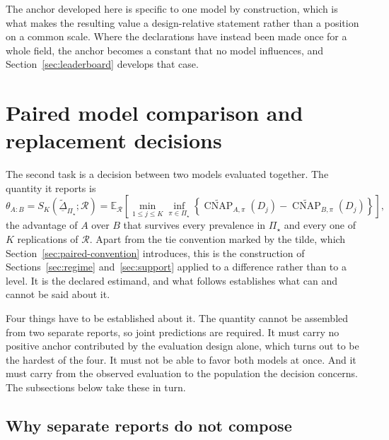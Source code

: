 \documentclass[11pt]{article}
\newcommand{\CNAP}{\operatorname{CNAP}}
\newcommand{\Regime}{\mathcal{R}}
\newcommand{\PSet}{\Pi_\star}
\newcommand{\E}{\mathbb{E}}
\newcommand{\CNAPta}{\widetilde{\CNAP}}
\newcommand{\RobDta}{\underline{\widetilde{\Delta}}_{\PSet}}
\theoremstyle{remark}
\begin{document}
The anchor developed here is specific to one model by construction, which is what makes the resulting value a design-relative statement rather than a position on a common scale. Where the declarations have instead been made once for a whole field, the anchor becomes a constant that no model influences, and Section~\ref{sec:leaderboard} develops that case.

\section{Paired model comparison and replacement decisions}
\label{sec:paired}

The second task is a decision between two models evaluated together. The quantity it reports is
\begin{equation}
\theta_{A:B}
=
S_K(\RobDta;\Regime)
=
\E_{\Regime}
\left[
\min_{1\leq j\leq K}
\inf_{\pi\in\PSet}
\left\{
\CNAPta_{A,\pi}(D_j)
-
\CNAPta_{B,\pi}(D_j)
\right\}
\right],
\label{eq:robust-paired-support}
\end{equation}
the advantage of $A$ over $B$ that survives every prevalence in $\PSet$ and every one of $K$ replications of $\Regime$. Apart from the tie convention marked by the tilde, which Section~\ref{sec:paired-convention} introduces, this is the construction of Sections~\ref{sec:regime} and~\ref{sec:support} applied to a difference rather than to a level. It is the declared estimand, and what follows establishes what can and cannot be said about it.

Four things have to be established about it. The quantity cannot be assembled from two separate reports, so joint predictions are required. It must carry no positive anchor contributed by the evaluation design alone, which turns out to be the hardest of the four. It must not be able to favor both models at once. And it must carry from the observed evaluation to the population the decision concerns. The subsections below take these in turn.

\subsection{Why separate reports do not compose}
\label{sec:marginal}
\end{document}

